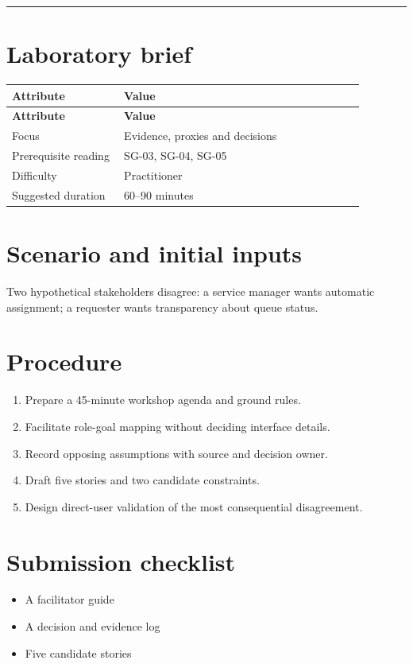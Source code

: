 \documentclass[11pt,letterpaper]{article}
\begin{document}
\tableofcontents\medskip\noindent\rule{\linewidth}{0.4pt}\medskip
\section{Laboratory brief}
\begin{longtable}{|p{0.28\linewidth}|p{0.60\linewidth}|}\hline
\textbf{Attribute} & \textbf{Value} \\ \hline\endfirsthead\hline
\textbf{Attribute} & \textbf{Value} \\ \hline\endhead
Focus & Evidence, proxies and decisions \\ \hline
Prerequisite reading & SG-03, SG-04, SG-05 \\ \hline
Difficulty & Practitioner \\ \hline
Suggested duration & 60–90 minutes \\ \hline
\end{longtable}
\section{Scenario and initial inputs}
Two hypothetical stakeholders disagree: a service manager wants automatic assignment; a requester wants transparency about queue status.

\section{Procedure}
\begin{enumerate}[leftmargin=*,itemsep=3pt]
\item Prepare a 45-minute workshop agenda and ground rules.
\item Facilitate role-goal mapping without deciding interface details.
\item Record opposing assumptions with source and decision owner.
\item Draft five stories and two candidate constraints.
\item Design direct-user validation of the most consequential disagreement.
\end{enumerate}
\section{Submission checklist}
\begin{itemize}[leftmargin=*,itemsep=2pt]
\item A facilitator guide
\item A decision and evidence log
\item Five candidate stories
\end{itemize}
\end{document}

